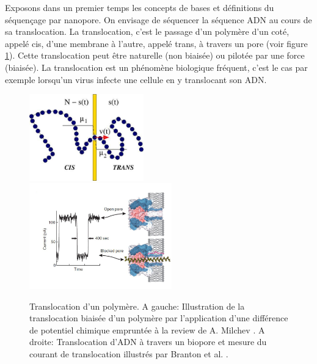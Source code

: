 Exposons dans un premier temps les concepts de bases et définitions du séquençage par nanopore. On envisage de séquencer la séquence ADN au cours de sa translocation. La translocation, c'est le passage d'un polymère d'un coté, appelé cis, d'une membrane à l'autre, appelé trans, à travers un pore (voir figure \ref{translocbase}). Cette translocation peut être naturelle (non biaisée) ou pilotée par une force (biaisée). La translocation est un phénomène biologique fréquent, c'est le cas par exemple lorsqu'un virus infecte une cellule en y translocant son ADN.

\begin{figure}[H]
\begin{center}
\includegraphics[width=0.44\textwidth]{translocation.jpg} \includegraphics[width=0.55\textwidth]{translocissues.jpg}

\caption[translocation et courant de blocage]{Translocation d'un polymère. A gauche: Illustration de la translocation biaisée d'un polymère par l'application d'une différence de potentiel chimique empruntée à la review de A. Milchev \cite{Milchev2011}. A droite: Translocation d'ADN à travers un biopore et mesure du courant de translocation illustrés par Branton et al. \cite{Branton2008}.}
\label{translocbase}
\end{center}
\end{figure}

